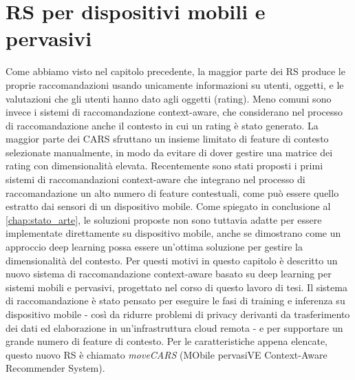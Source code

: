 \documentclass[12pt,italian]{report}
\begin{document}
% 
% 

\chapter{RS per dispositivi mobili e pervasivi}
\label{chap:classificatore}
Come abbiamo visto nel capitolo precedente, la maggior parte dei RS produce le proprie raccomandazioni usando unicamente informazioni su utenti, oggetti, e le valutazioni che gli utenti hanno dato agli oggetti (rating). Meno comuni sono invece i sistemi di raccomandazione context-aware, che considerano nel processo di raccomandazione anche il contesto in cui un rating è stato generato. La maggior parte dei CARS sfruttano un insieme limitato di feature di contesto selezionate manualmente, in modo da evitare di dover gestire una matrice dei rating con dimensionalità elevata. Recentemente sono stati proposti i primi sistemi di raccomandazioni context-aware che integrano nel processo di raccomandazione un alto numero di feature contestuali, come può essere quello estratto dai sensori di un dispositivo mobile. Come spiegato in conclusione al \autoref{chap:stato_arte}, le soluzioni proposte non sono tuttavia adatte per essere implementate direttamente su dispositivo mobile, anche se dimostrano come un approccio deep learning possa essere un'ottima soluzione per gestire la dimensionalità del contesto. Per questi motivi in questo capitolo è descritto un nuovo sistema di raccomandazione context-aware basato su deep learning per sistemi mobili e pervasivi, progettato nel corso di questo lavoro di tesi. Il sistema di raccomandazione è stato pensato per eseguire le fasi di training e inferenza su dispositivo mobile - così da ridurre problemi di privacy derivanti da trasferimento dei dati ed elaborazione in un'infrastruttura cloud remota - e per supportare un grande numero di feature di contesto. Per le caratteristiche appena elencate, questo nuovo RS è chiamato \textit{moveCARS} (MObile pervasiVE Context-Aware Recommender System).
\end{document}
